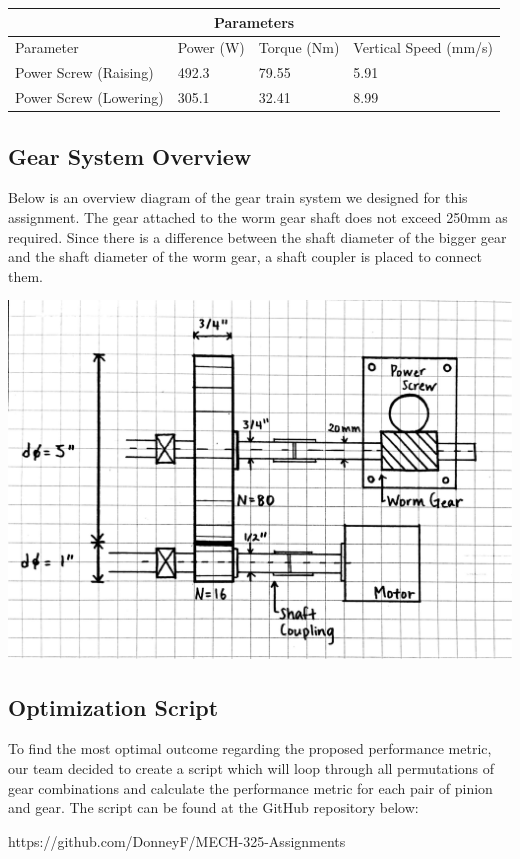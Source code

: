 \documentclass[letterpaper,12pt]{article}
\begin{document}
\begin{center}
	\begin{tabular}{ |p{4.5cm}||p{2cm}|p{2.5cm}|p{4cm}|  }
		\hline
		\multicolumn{4}{|c|}{Parameters} \\
		\hline
		Parameter & Power (W) & Torque (Nm) & Vertical Speed (mm/s) \\
		\hline
		Power Screw (Raising) & 492.3 & 79.55 & 5.91 \\
		Power Screw (Lowering) & 305.1 & 32.41 & 8.99 \\
		\hline
	\end{tabular}
\end{center}

\subsection{Gear System Overview}
Below is an overview diagram of the gear train system we designed for this assignment. The gear attached to the worm gear shaft does not exceed 250mm as required. Since there is a difference between the shaft diameter of the bigger gear and the shaft diameter of the worm gear, a shaft coupler is placed to connect them.
\begin{center}
\includegraphics[width=16cm]{MECH325A1System}
\end{center}

\subsection{Optimization Script}
To find the most optimal outcome regarding the proposed performance metric, our team decided to create a script which will loop through all permutations of gear combinations and calculate the performance metric for each pair of pinion and gear. The script can be found at the GitHub repository below: \\
\begin{center}
    https://github.com/DonneyF/MECH-325-Assignments
\end{center}
\end{document}
